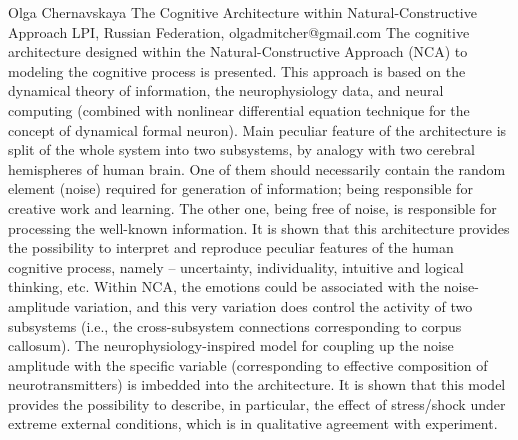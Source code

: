 \documentclass[10pt,fleqn,openany]{book} %
\begin{document}
\begin{enumerate}
	\paperabstract
		{Olga Chernavskaya}
		{The Cognitive Architecture within Natural-Constructive Approach }
		{LPI, Russian Federation, olgadmitcher@gmail.com}
		{
			The cognitive architecture designed within the Natural-Constructive Approach (NCA) to modeling the cognitive process is presented. This approach is based on the dynamical theory of information, the neurophysiology data, and neural computing (combined with nonlinear differential equation technique for the concept of dynamical formal neuron). Main peculiar feature of the architecture is split of the whole system into two subsystems, by analogy with two cerebral hemispheres of human brain. One of them should necessarily contain the random element (noise) required for generation of information; being responsible for creative work and learning. The other one, being free of noise, is responsible for processing the well-known information. It is shown that this architecture provides the possibility to interpret and reproduce peculiar features of the human cognitive process, namely – uncertainty, individuality, intuitive and logical thinking, etc. Within NCA, the emotions could be associated with the noise-amplitude variation, and this very variation does control the activity of two subsystems (i.e., the cross-subsystem connections corresponding to corpus callosum). The neurophysiology-inspired model for coupling up the noise amplitude with the specific variable (corresponding to effective composition of neurotransmitters) is imbedded into the architecture. It is shown that this model provides the possibility to describe, in particular, the effect of stress/shock under extreme external conditions, which is in qualitative agreement with experiment.}
		

\end{enumerate}
\end{document}
